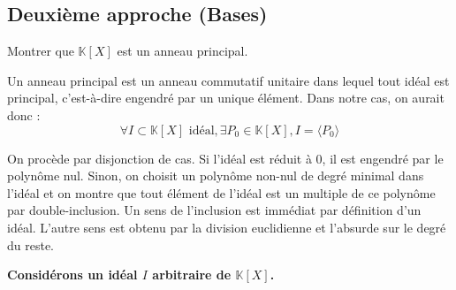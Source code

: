 \documentclass[11pt, a4paper]{article}
\theoremstyle{definition}
\begin{document}
\subsection*{Deuxième approche (Bases)}

\clearpage

\begin{tcolorbox}[instructionstyle]
Montrer que $\mathbb K[X]$ est un anneau principal.
\end{tcolorbox}

\begin{rappel}
	Un anneau principal est un anneau commutatif unitaire dans lequel tout idéal est principal, c'est-à-dire engendré par un unique élément. Dans notre cas, on aurait donc :
	$$\forall I \subset \mathbb K[X] \text{ idéal}, \exists P_0 \in \mathbb K[X], I = \langle P_0 \rangle$$
\end{rappel}

\begin{tcolorbox}[methodstyle]
  On procède par disjonction de cas. Si l'idéal est réduit à 0, il est engendré par le polynôme nul. Sinon, on choisit un polynôme non-nul de degré minimal dans l'idéal et on montre que tout élément de l'idéal est un multiple de ce polynôme par double-inclusion. Un sens de l'inclusion est immédiat par définition d'un idéal. L'autre sens est obtenu par la division euclidienne et l'absurde sur le degré du reste.
\end{tcolorbox}

\textbf{Considérons un idéal $I$ arbitraire de $\mathbb K[X]$.}
\end{document}
